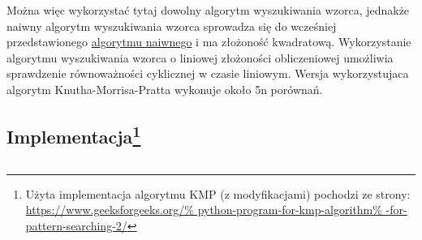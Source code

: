 \documentclass{scrartcl}
\theoremstyle{definition}
\theoremstyle{definition}
\begin{document}
Można więc wykorzystać tytaj dowolny algorytm wyszukiwania wzorca,
jednakże naiwny algorytm wyszukiwania wzorca sprowadza się do
wcześniej przedstawionego
\hyperref[sec:naive_alg]{algorytmu naiwnego}
i ma złożoność kwadratową.
Wykorzystanie algorytmu wyszukiwania wzorca
o liniowej złożoności obliczeniowej
umożliwia sprawdzenie równoważności cyklicznej
w czasie liniowym.\cite{alg}
Wersja wykorzystujaca algorytm Knutha-Morrisa-Pratta
wykonuje około 5n porównań.\cite{shiloach1979}
\pagebreak
\subsection[Implementacja]{Implementacja\footnote{
        Użyta implementacja algorytmu KMP (z modyfikacjami)
        pochodzi ze strony:\\
        \url{https://www.geeksforgeeks.org/%
            python-program-for-kmp-algorithm%
            -for-pattern-searching-2/}
    }}
\inputminted[fontsize=\normalsize]{python3}{pattern_matching.py}

\pagebreak
\printbibliography[heading=bibintoc]
\end{document}
